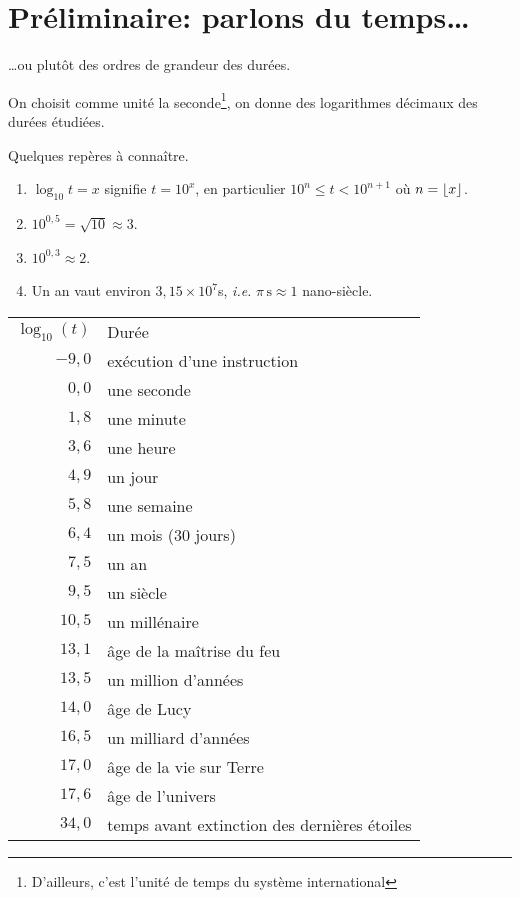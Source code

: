 \section{Préliminaire: parlons du temps\ldots{}}

\ldots{}ou plutôt des ordres de grandeur des durées.

On choisit comme unité la seconde\footnote{D'ailleurs, c'est l'unité de temps du système international}, on donne des logarithmes décimaux des durées étudiées.

Quelques repères à connaître.
\begin{enumerate}
\item  $\log_{10} t = x$ signifie $t = 10^{x}$, en particulier
$10^{n}\leq t < 10^{n+1}$ où $n = \left\lfloor x\right\rfloor$.
\item $10^{0,5} = \sqrt{10} \approx 3$.
\item $10^{0,3} \approx 2$.
\item Un an vaut environ $3,15\times 10^{7}$s, \emph{i.e.} $\pi \,\mathrm{s} \approx 1$ nano-siècle.
\end{enumerate}

\begin{center}
  \begin{tabular}{rl}
  $\log_{10}(t)$ & Durée\\
  $-9,0$ & exécution d'une instruction\\
  $0,0$ & une seconde\\
  $1,8$ & une minute \\
  $3,6$ & une heure\\
  $4,9$ & un jour\\
  $5,8$ & une semaine\\
  $6,4$ & un mois (30 jours)\\
  $7,5$ & un an\\
  $9,5$ & un siècle\\
  $10,5$ & un millénaire\\
  $13,1$ & âge de la maîtrise du feu\\
  $13,5$ & un million d'années\\
  $14,0$ & âge de Lucy\\
  $16,5$ & un milliard d'années\\
  $17,0$ & âge de la vie sur Terre\\
  $17,6$ & âge de l'univers\\
  $34,0$ & temps avant extinction des dernières étoiles\\
\end{tabular}
\end{center}


